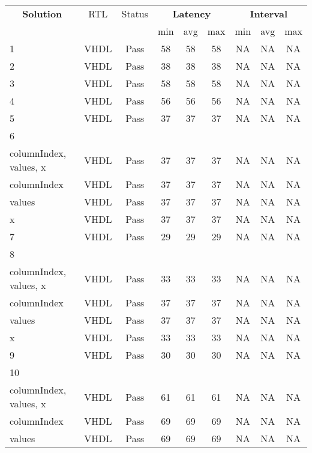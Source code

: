\begin{table}[H]
	\centering
	\begin{tabular}{|l|c|c|c|c|c|c|c|c|}
		\hline
		\multicolumn{1}{|c|}{\textbf{Solution}} & \multicolumn{1}{|c|}{RTL} & \multicolumn{1}{|c|}{Status} & \multicolumn{3}{c|}{\textbf{Latency}} & \multicolumn{3}{c|}{\textbf{Interval}} \\
		& &  & min & avg & max & min & avg & max \\
		\hline
		1 & VHDL & Pass & 58 & 58 & 58 & NA & NA & NA \\
		\hline
		2 & VHDL & Pass & 38 & 38 & 38 & NA & NA & NA \\
		\hline
		3 & VHDL & Pass & 58 & 58 & 58 & NA & NA & NA \\
		\hline
		4 & VHDL & Pass & 56 & 56 & 56 & NA & NA & NA \\
		\hline
		5 & VHDL & Pass & 37 & 37 & 37 & NA & NA & NA \\
		\hline
		6 &  &  &  &  &  &  &  &  \\
		\tabitem columnIndex, values, x & VHDL & Pass & 37 & 37 & 37 & NA & NA & NA \\
		\tabitem columnIndex & VHDL & Pass & 37 & 37 & 37 & NA & NA & NA \\
		\tabitem values & VHDL & Pass & 37 & 37 & 37 & NA & NA & NA \\
		\tabitem x & VHDL & Pass & 37 & 37 & 37 & NA & NA & NA \\
		\hline
		7 & VHDL & Pass & 29 & 29 & 29 & NA & NA & NA \\
		\hline
		8 &  &  &  &  &  &  &  &  \\
		\tabitem columnIndex, values, x & VHDL & Pass & 33 & 33 & 33 & NA & NA & NA \\
		\tabitem columnIndex & VHDL & Pass & 37 & 37 & 37 & NA & NA & NA \\
		\tabitem values & VHDL & Pass & 37 & 37 & 37 & NA & NA & NA \\
		\tabitem x & VHDL & Pass & 33 & 33 & 33 & NA & NA & NA \\
		\hline
		9 & VHDL & Pass & 30 & 30 & 30 & NA & NA & NA \\
		\hline
		10 &  &  &  &  &  &  &  &  \\
		\tabitem columnIndex, values, x & VHDL & Pass & 61 & 61 & 61 & NA & NA & NA \\
		\tabitem columnIndex & VHDL & Pass & 69 & 69 & 69 & NA & NA & NA \\
		\tabitem values & VHDL & Pass & 69 & 69 & 69 & NA & NA & NA \\

\end{tabular}
\end{table}
